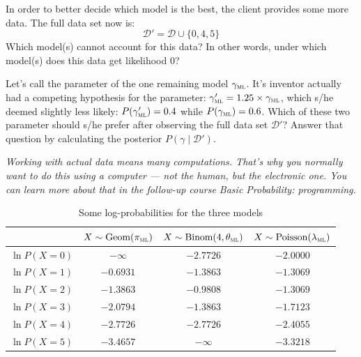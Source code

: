 \documentclass[a4paper,10pt,landscape,twocolumn]{scrartcl}
\begin{document}
\begin{exercise}
	\begin{subex}[0.5pt]
		In order to better decide which model is the best, the client provides some more data. The full
		data set now is:
		\[
			\mathcal D' = \mathcal D \cup \{ 0, 4, 5 \}
		\]
		Which model(s) cannot account for this data? In other words, under which model(s) does this data get likelihood 0?
	\end{subex}
	
	\begin{subex}[1pt]
	Let's call the parameter of the one remaining model	$\gamma_\textsc{ml}$. It's inventor actually had a competing hypothesis for the parameter: $\gamma_\textsc{ml}' = 1.25 \times \gamma_\textsc{ml}$, which s/he deemed slightly less likely: $P(\gamma_\textsc{ml}') = 0.4$ while $P(\gamma_\textsc{ml}) = 0.6$. Which of these two parameter should s/he prefer after observing the full data set $\mathcal{D'}$? Answer that question by calculating the posterior $P(\gamma \mid \mathcal{D'})$.
	\end{subex}
	
	\bigbreak\noindent
	\emph{Working with actual data means many computations. That's why you normally want to do this using a computer --- not the human, but the electronic one. You can learn more about that in the follow-up course \emph{Basic Probability: programming}.}
\end{exercise}

\begin{table}
\begin{tabular}{l c c c}
& 	$X \sim \text{Geom}(\pi_\textsc{ml})$
&	$X \sim \text{Binom}(4, \theta_\textsc{ml})$
&	$X \sim \text{Poisson}(\lambda_\textsc{ml})$ \\\hline\hline
$\ln P(X = 0)$ &$-\infty$ &$-2.7726$ &$-2.0000$ \\\hline
$\ln P(X = 1)$ &$-0.6931$ &$-1.3863$ &$-1.3069$ \\\hline
$\ln P(X = 2)$ &$-1.3863$ &$-0.9808$ &$-1.3069$ \\\hline
$\ln P(X = 3)$ &$-2.0794$ &$-1.3863$ &$-1.7123$ \\\hline
$\ln P(X = 4)$ &$-2.7726$ &$-2.7726$ &$-2.4055$ \\\hline
$\ln P(X = 5)$ &$-3.4657$ &$-\infty$ &$-3.3218$ \\\hline
\end{tabular}
\caption{Some log-probabilities for the three models \label{table}}
\end{table}
\end{document}
